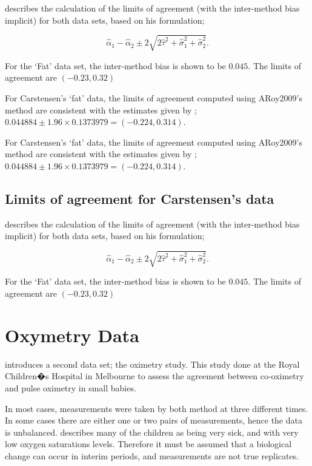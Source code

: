 \documentclass[12pt, a4paper]{report}
\theoremstyle{plain}
\theoremstyle{definition}
\theoremstyle{remark}
\begin{document}
	
	
	
	\citet{BXC2008} describes the calculation of the limits of agreement (with the inter-method bias implicit) for both data sets, based on his formulation;
	
	\[\hat{\alpha}_1 - \hat{\alpha}_2 \pm 2\sqrt{2\hat{\tau}^2 +\hat{\sigma}_1^2 +\hat{\sigma}_2^2 }.\]
	
	
	For the `Fat' data set, the inter-method bias is shown to be $0.045$. The limits of agreement are $(-0.23 , 0.32)$
	
	For Carstensen's `fat' data, the limits of agreement computed using ARoy2009's
	method are consistent with the estimates given by \citet{BXC2008}; $0.044884  \pm 1.96 \times  0.1373979 = (-0.224,  0.314).$
	
	
	
	For Carstensen's `fat' data, the limits of agreement computed using ARoy2009's
	method are consistent with the estimates given by \citet{BXC2008}; $0.044884  \pm 1.96 \times  0.1373979 = (-0.224,  0.314).$
	
	
	
	
	\subsection{Limits of agreement for Carstensen's data}
	
	
	\citet{BXC2008} describes the calculation of the limits of agreement (with the inter-method bias implicit) for both data sets, based on his formulation;
	
	\[\hat{\alpha}_1 - \hat{\alpha}_2 \pm 2\sqrt{2\hat{\tau}^2 +\hat{\sigma}_1^2 +\hat{\sigma}_2^2 }.\]
	
	For the `Fat' data set, the inter-method bias is shown to be $0.045$. The limits of agreement are $(-0.23 , 0.32)$
	
	\section{Oxymetry Data}	
	\citet{BXC2008} introduces a second data set; the oximetry study. This study done at the Royal Children�s Hospital in
	Melbourne to assess the agreement between co-oximetry and pulse oximetry in small babies.

	
	In most cases, measurements were taken by both method at three different times. In some cases there are either one or two pairs of measurements, hence the data is unbalanced. \citet{BXC2008} describes many of the children as being very sick, and with very low oxygen saturations levels. Therefore it must be assumed that a biological change can occur in interim periods, and measurements are not true replicates.
	
\end{document}

